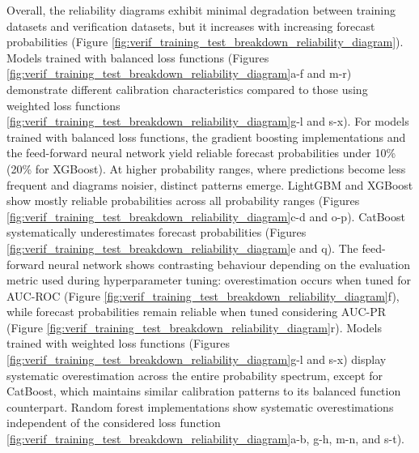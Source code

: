 \documentclass[nhess, manuscript]{copernicus}
\begin{document}
Overall, the reliability diagrams exhibit minimal degradation between \textcolor{colourTraining}{training datasets} and verification datasets, but it increases with increasing forecast probabilities (Figure \ref{fig:verif_training_test_breakdown_reliability_diagram}). Models trained with balanced loss functions (Figures \ref{fig:verif_training_test_breakdown_reliability_diagram}a-f and m-r) demonstrate different calibration characteristics compared to those using weighted loss functions \ref{fig:verif_training_test_breakdown_reliability_diagram}g-l and s-x). For models trained with balanced loss functions, the gradient boosting implementations and the feed-forward neural network yield reliable forecast probabilities under 10\% (20\% for XGBoost). At higher probability ranges, where predictions become less frequent and diagrams noisier, distinct patterns emerge. LightGBM and XGBoost show mostly reliable probabilities across all probability ranges (Figures \ref{fig:verif_training_test_breakdown_reliability_diagram}c-d and o-p). CatBoost systematically underestimates forecast probabilities (Figures \ref{fig:verif_training_test_breakdown_reliability_diagram}e and q). The feed-forward neural network shows contrasting behaviour depending on the evaluation metric used during hyperparameter tuning: overestimation occurs when tuned for AUC-ROC (Figure \ref{fig:verif_training_test_breakdown_reliability_diagram}f), while forecast probabilities remain reliable when tuned considering AUC-PR (Figure \ref{fig:verif_training_test_breakdown_reliability_diagram}r). Models trained with weighted loss functions (Figures \ref{fig:verif_training_test_breakdown_reliability_diagram}g-l and s-x) display systematic overestimation across the entire probability spectrum, except for CatBoost, which maintains similar calibration patterns to its balanced function counterpart. Random forest implementations show systematic overestimations independent of the considered loss function \ref{fig:verif_training_test_breakdown_reliability_diagram}a-b, g-h, m-n, and s-t).
\end{document}
